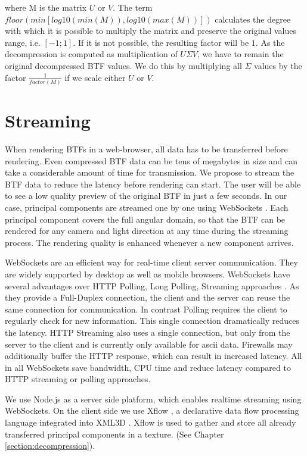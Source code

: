  where M is the matrix $U$ or $V$. The term $floor(min[log10(min(M)),log10(max(M))])$ calculates the degree with which it is possible to multiply the matrix and preserve the original values range, i.e. $[-1;1]$.
 If it is not possible, the resulting factor will be $1$.
As the decompression is computed as multiplication of $U\Sigma V$, we have to remain the original decompressed BTF values.
We do this by  multiplying all $\Sigma$ values by the factor $\tfrac{1}{factor(M)}$ if we scale either $U$ or $V$.


 
\section{Streaming}
\label{section:impl_streaming}

When rendering BTFs in a web-browser, all data has to be transferred before rendering.
Even compressed BTF data can be tens of megabytes in size and can take a considerable amount of time for transmission.
We propose to stream the BTF data to reduce the latency before rendering can start.
 The user will be able to see a low quality preview of the original BTF in just a few seconds. 
In our case, principal components are streamed one by one using WebSockets \cite{WebSockets}.
Each principal component covers the full angular domain, so that the BTF can be rendered for any camera and light direction at any time during the streaming process.
The rendering quality is enhanced whenever a new component arrives.


 WebSockets are an efficient way for real-time client server communication.
 They are widely supported by desktop as well as mobile browsers.
WebSockets have several advantages over HTTP Polling, Long Polling, Streaming approaches \cite[Ch.\ 1]{WebSockets}.  
As they provide a Full-Duplex connection, the client and the server can reuse the same connection for communication.
In contrast Polling requires the client to regularly check for new information.
 This single connection dramatically reduces the latency.
HTTP Streaming also uses a single connection, but only from the server to the client and is currently only available for ascii  data. 
Firewalls may additionally buffer the HTTP response, which can result in increased latency.
All in all WebSockets save bandwidth, CPU time and reduce  latency compared to HTTP streaming or polling approaches.

We use Node.js \cite{nodejs} as a server side platform, which enables realtime streaming using WebSockets. 
On the client side we use Xflow \cite{xflow}, a declarative data flow processing language integrated into XML3D \cite{xml3d}.
 Xflow is used to gather and store all already transferred principal components in a texture. (See Chapter  \ref{section:decompression}).





